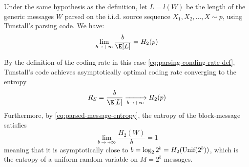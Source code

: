 \documentclass[toc, titlepaged]{../cs-classes/cs-classes}
\begin{document}
\begin{theorem}
    Under the same hypothesis as the definition, let $L=l(W)$ be the length of the generic messages $W$ parsed on the i.i.d. source sequence $X_1, X_2, \dots, X\sim p$, using Tunstall's parsing code. We have:
    \begin{equation}
        \lim_{b\to+\infty}\frac{b}{\E[L]} = H_2(p)
    \end{equation}
\end{theorem}

\begin{corollary}
    By the definition of the coding rate in this case \eqref{eq:parsing-conding-rate-def}, Tunstall's code achieves asymptotically optimal coding rate converging to the entropy
    \begin{equation*}
        R_S = \frac{b}{\E[L]} \xrightarrow[b\to+\infty]{} H_2(p)
    \end{equation*}
    Furthermore, by \eqref{eq:parsed-message-entropy}, the entropy of the block-message satisfies
    \begin{equation}
        \lim_{b\to+\infty} \frac{H_2(W)}{b} = 1
    \end{equation}
    meaning that it is asymptotically close to $b=\log_22^b=H_2(\textnormal{Unif}(2^b))$, which is the entropy of a uniform random variable on $M=2^b$ messages.
\end{corollary}
\end{document}
